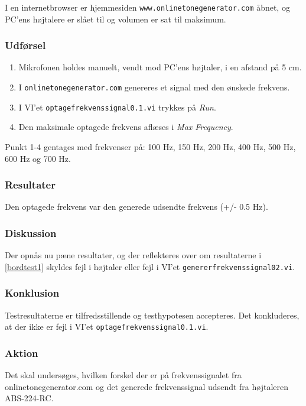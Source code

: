 		I en internetbrowser er hjemmesiden \texttt{www.onlinetonegenerator.com} åbnet, og PC'ens højtalere er slået til og volumen er sat til maksimum.
		
		\subsubsection{Udførsel}
			\begin{enumerate}
				\item Mikrofonen holdes manuelt, vendt mod PC'ens højtaler, i en afstand på 5 cm. 
				\item I \texttt{onlinetonegenerator.com} genereres et signal med den ønskede frekvens. 
				\item I VI'et \texttt{optagefrekvenssignal0.1.vi} trykkes på \textit{Run}. 
					
					\item Den maksimale optagede frekvens aflæses i \textit{Max Frequency}. 
					  
			\end{enumerate}
			
			Punkt 1-4 gentages med frekvenser på: 100 Hz, 150 Hz, 200 Hz, 400 Hz, 500 Hz, 600 Hz og 700 Hz. 
			
			\subsubsection{Resultater}
			Den optagede frekvens var den generede udsendte frekvens (+/- 0.5 Hz). 
			\subsubsection{Diskussion}
			Der opnås nu pæne resultater, og der reflekteres over om resultaterne i \ref{bordtest1} skyldes fejl i højtaler eller fejl i VI'et \texttt{genererfrekvenssignal02.vi}. 
			\subsubsection{Konklusion}
			Testresultaterne er tilfredsstillende og testhypotesen accepteres. Det konkluderes, at der ikke er fejl i VI'et \texttt{optagefrekvenssignal0.1.vi}. 
			\subsubsection{Aktion}
			Det skal undersøges, hvilken forskel der er på frekvenssignalet fra onlinetonegenerator.com og det generede frekvenssignal udsendt fra højtaleren ABS-224-RC.  
	
